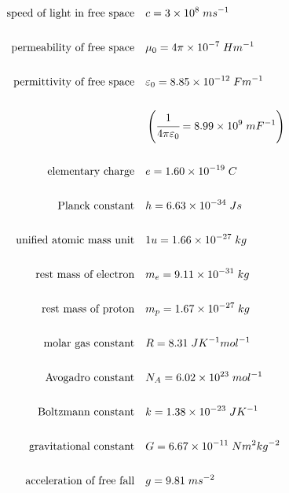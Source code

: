 \documentclass{article}
\begin{document}
\begin{align*}
        \mbox{speed of light in free space} \quad & c=3\times 10^{8}\; ms^{-1} \\ \\
        \mbox{permeability of free space} \quad & \mu_0=4\pi\times {10}^{-7} \;Hm^{-1} \\ \\
        \mbox{permittivity of free space}\quad & \varepsilon_0=8.85\times 10^{-12}\;Fm^{-1} \\ \\
            & \left(\cfrac{1}{4\pi\varepsilon_0}=8.99\times 10^{9}\; mF^{-1}\right)\\\\
        \mbox{elementary charge} \quad & e=1.60\times 10^{-19}\; C \\ \\
        \mbox{Planck constant} \quad & h=6.63\times 10^{-34}\; Js \\ \\
        \mbox{unified atomic mass unit} \quad & 1u=1.66\times 10^{-27}\; kg \\ \\
        \mbox{rest mass of electron} \quad & m_e=9.11\times 10^{-31}\;kg \\ \\
        \mbox{rest mass of proton} \quad &  m_p=1.67\times 10^{-27} \; kg \\ \\
        \mbox{molar gas constant} \quad & R=8.31\;JK^{-1}mol^{-1} \\ \\
        \mbox{Avogadro constant} \quad & N_A=6.02\times10^{23}\; mol^{-1} \\ \\
        \mbox{Boltzmann constant} \quad & k=1.38\times 10^{-23} \; JK^{-1} \\ \\
        \mbox{gravitational constant} \quad & G=6.67\times 10^{-11} \; Nm^2kg^{-2} \\ \\
        \mbox{acceleration of free fall} \quad & g=9.81\;ms^{-2}
\end{align*}

\newpage
\end{document}
